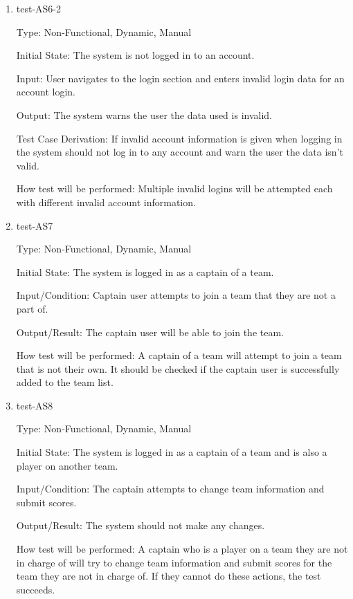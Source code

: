 \documentclass[12pt, titlepage]{article}
\begin{document}
\begin{enumerate}
  \item{test-AS6-2\\}

  Type: Non-Functional, Dynamic, Manual

  Initial State: The system is not logged in to an account.

  Input: User navigates to the login section and enters invalid login data
  for an account login.

  Output: The system warns the user the data used is invalid.

  Test Case Derivation: If invalid account information is given when logging
  in the system should not log in to any account and warn the user the data
  isn't valid.

  How test will be performed: Multiple invalid logins will be attempted each
  with different invalid account information.

  \item{test-AS7\\}
  
  Type: Non-Functional, Dynamic, Manual
            
  Initial State: The system is logged in as a captain of a team. 
            
  Input/Condition: Captain user attempts to join a team that they are not a part
  of.
            
  Output/Result: The captain user will be able to join the team.
            
  How test will be performed: A captain of a team will attempt to join a
  team that is not their own. It should be checked if the captain user is
  successfully added to the team list.

  \item{test-AS8\\}

  Type: Non-Functional, Dynamic, Manual

  Initial State: The system is logged in as a captain of a team and is also a
  player on another team.

  Input/Condition: The captain attempts to change team information and submit
  scores.

  Output/Result: The system should not make any changes.

  How test will be performed: A captain who is a player on a team they are not
  in charge of will try to change team information and submit scores for the
  team they are not in charge of. If they cannot do these actions, the test
  succeeds.


\end{enumerate}
\end{document}
